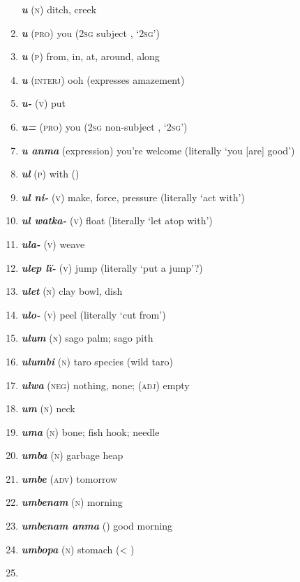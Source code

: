 \begin{enumerate}[noitemsep, label={}, align=left, widest=190, labelsep=1ex,leftmargin=*,itemindent=-10pt]
\textbf{\textit{u}} (\textsc{n}) ditch, creek \item 
\textbf{\textit{u}} (\textsc{pro}) you (2\textsc{sg} subject , ‘\textsc{2sg}’) \item 
\textbf{\textit{u}} (\textsc{p}) from, in, at, around, along \item 
\textbf{\textit{u}} (\textsc{interj}) ooh (expresses amazement) \item 
\textbf{\textit{u-}} (\textsc{v}) put \item 
\textbf{\textit{u=}} (\textsc{pro}) you (2\textsc{sg} non-subject , ‘\textsc{2sg}’) \item 
\textbf{\textit{u anma}} (expression) you’re welcome (literally ‘you [are] good’) \item 
\textbf{\textit{ul}} (\textsc{p}) with () \item 
\textbf{\textit{ul ni-}} (\textsc{v}) make, force, pressure (literally ‘act with’) \item 
\textbf{\textit{ul watka-}} (\textsc{v}) float (literally ‘let atop with’) \item 
\textbf{\textit{ula-}} (\textsc{v}) weave \item 
\textbf{\textit{ulep lï-}} (\textsc{v}) jump (literally ‘put a jump’?) \item 
\textbf{\textit{ulet}} (\textsc{n}) clay bowl, dish \item 
\textbf{\textit{ulo-}} (\textsc{v}) peel (literally ‘cut from’) \item 
\textbf{\textit{ulum}} (\textsc{n}) sago palm; sago pith \item 
\textbf{\textit{ulumbi}} (\textsc{n}) taro species (wild taro) \item 
\textbf{\textit{ulwa}} (\textsc{neg}) nothing, none; (\textsc{adj}) empty \item 
\textbf{\textit{um}} (\textsc{n}) neck \item 
\textbf{\textit{uma}} (\textsc{n}) bone; fish hook; needle \item 
\textbf{\textit{umba}} (\textsc{n}) garbage heap \item 
\textbf{\textit{umbe}} (\textsc{adv)} tomorrow \item 
\textbf{\textit{umbenam}} (\textsc{n)} morning \item 
\textbf{\textit{umbenam anma}} () good morning \item 
\textbf{\textit{umbopa}} (\textsc{n}) stomach (< ) \item 

\end{enumerate}
